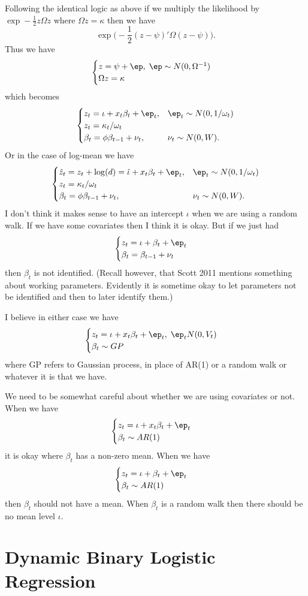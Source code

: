 \documentclass{article}
\begin{document}
Following the identical logic as above if we multiply the likelihood by
$\exp - \frac{1}{2} z \Omega z$ where $\Omega z = \kappa$ then we have
\[
\exp \Big( -\frac{1}{2} (z - \psi)' \Omega (z- \psi) \Big).
\]
Thus we have
\[
\begin{cases}
z = \psi + \ep, \; \ep \sim N(0, \Omega^{-1}) \\
\Omega z = \kappa
\end{cases}
\]
which becomes
\[
\begin{cases}
z_t = \iota + x_t \beta_t + \ep_t, & \ep_t \sim N(0, 1/\omega_t) \\
z_t = \kappa_t / \omega_t \\
\beta_t = \phi \beta_{t-1} + \nu_t, & \nu_t \sim N(0, W).
\end{cases}
\]
Or in the case of log-mean we have
\[
\begin{cases}
\hat z_t = z_t + \log(d) = \hat \iota + x_t \beta_t + \ep_t, 
  & \ep_t \sim N(0, 1/\omega_t) \\
z_t = \kappa_t / \omega_t \\
\beta_t = \phi \beta_{t-1} + \nu_t, & \nu_t \sim N(0, W).
\end{cases}
\]
I don't think it makes sense to have an intercept $\iota$ when we are using a
random walk.  If we have some covariates then I think it is okay.  But if we
just had
\[
\begin{cases}
z_t = \iota + \beta_t + \ep_t \\
\beta_t = \beta_{t-1} + \nu_t
\end{cases}
\]
then $\beta_t$ is not identified.  (Recall however, that Scott 2011 mentions
something about working parameters.  Evidently it is sometime okay to let
parameters not be identified and then to later identify them.)

I believe in either case we have
\[
\begin{cases}
z_t = \iota + x_t \beta_t + \ep_t, \; \ep_t N(0, V_t) \\
\beta_t \sim GP
\end{cases}
\]
where GP refers to Gaussian process, in place of AR(1) or a random walk or
whatever it is that we have.

We need to be somewhat careful about whether we are using covariates or not.
When we have
\[
\begin{cases}
z_t = \iota + x_t \beta_t + \ep_t \\
\beta_t \sim AR(1)
\end{cases}
\]
it is okay where $\beta_t$ has a non-zero mean.
When we have
\[
\begin{cases}
z_t = \iota + \beta_t + \ep_t \\
\beta_t \sim AR(1)
\end{cases}
\]
then $\beta_t$ should not have a mean.  When $\beta_t$ is a random walk then
there should be no mean level $\iota$.

\section{Dynamic Binary Logistic Regression}



% 
\end{document}
